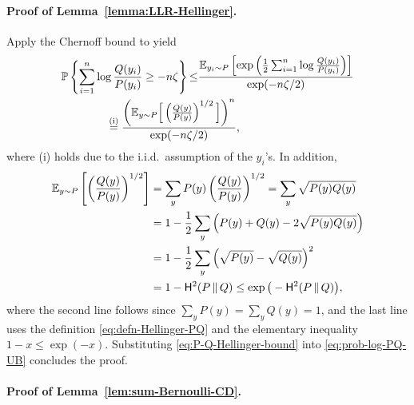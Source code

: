 \paragraph{Proof of Lemma~\ref{lemma:LLR-Hellinger}.}
Apply the Chernoff bound to yield 
%
\begin{align}
 & \mathbb{P}\left\{ \sum_{i=1}^{n}\log\frac{Q(y_{i})}{P(y_{i})}\geq-n\zeta\right\} {\leq}\frac{\mathbb{E}_{y_{i}\sim P}\left[\exp\left(\frac{1}{2}\sum_{i=1}^{n}\log\frac{Q(y_{i})}{P(y_{i})}\right)\right]}{\exp(-n\zeta/2)} \notag\\
 & \qquad \qquad\overset{(\mathrm{i})}{=}
 \frac{\left(\mathbb{E}_{y\sim P}\Big[\left(\frac{Q(y)}{P(y)}\right)^{1/2}\Big]\right)^{n}}{\exp(-n\zeta/2)},
\label{eq:prob-log-PQ-UB}
\end{align}
%
where 
(i) holds due to the i.i.d.~assumption of the $y_{i}$'s.  In addition,
%
\begin{align}
\mathbb{E}_{y\sim P}\left[\left(\frac{Q(y)}{P(y)}\right)^{1/2}\right] & =\sum_{y}P(y)\left(\frac{Q(y)}{P(y)}\right)^{1/2}=\sum_{y}\sqrt{P(y)Q(y)} \notag\\
 & =1-\frac{1}{2}\sum_{y}\left(P(y)+Q(y)-2\sqrt{P(y)Q(y)}\right) \notag\\
  & =1-\frac{1}{2}\sum_{y}\left( \sqrt{P(y)} - \sqrt{Q(y)} \right)^2 \notag\\
 & =1-\mathsf{H}^2(P\,\|\,Q)\leq  \exp \big(-\mathsf{H}^2(P\,\|\,Q) \big),
 \label{eq:P-Q-Hellinger-bound}
\end{align}
%
where the second line follows since $\sum_yP(y) = \sum_yQ(y)=1$, and  the last line uses the definition \eqref{eq:defn-Hellinger-PQ} and the elementary inequality $1-x\leq \exp(-x)$. 
Substituting \eqref{eq:P-Q-Hellinger-bound} into \eqref{eq:prob-log-PQ-UB} concludes the proof. 







\paragraph{Proof of Lemma~\ref{lem:sum-Bernoulli-CD}.}

